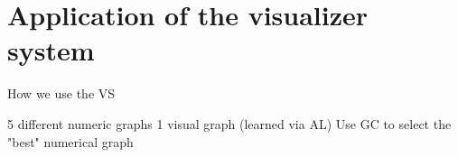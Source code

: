\section{Application of the visualizer system}
\label{sec:usage:newanalysis}

How we use the VS

5 different numeric graphs
1 visual graph (learned via AL)
Use GC to select the "best" numerical graph